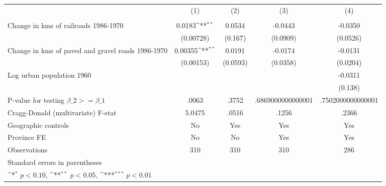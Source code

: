 {
\def\sym#1{\ifmmode^{#1}\else\(^{#1}\)\fi}
\begin{tabular}{l*{4}{c}}
\hline\hline
                &\multicolumn{1}{c}{(1)}&\multicolumn{1}{c}{(2)}&\multicolumn{1}{c}{(3)}&\multicolumn{1}{c}{(4)}\\
                &\multicolumn{1}{c}{}&\multicolumn{1}{c}{}&\multicolumn{1}{c}{}&\multicolumn{1}{c}{}\\
\hline
Change in kms of railroads 1986-1970&   0.0183\sym{**} &   0.0534         &  -0.0443         &  -0.0350         \\
                &(0.00728)         &  (0.167)         & (0.0909)         & (0.0526)         \\
[1em]
Change in kms of paved and gravel roads 1986-1970&  0.00355\sym{**} &   0.0191         &  -0.0174         &  -0.0131         \\
                &(0.00153)         & (0.0593)         & (0.0358)         & (0.0204)         \\
[1em]
Log urban population 1960&                  &                  &                  &  -0.0311         \\
                &                  &                  &                  &  (0.138)         \\
\hline
P-value for testing $\beta\_{2} >= \beta\_{1}$&    .0063         &    .3752         &.6869000000000001         &.7502000000000001         \\
Cragg-Donald (multivariate) F-stat&   5.0475         &    .0516         &    .1256         &    .2366         \\
Geographic controls&       No         &      Yes         &      Yes         &      Yes         \\
Province FE     &       No         &       No         &      Yes         &      Yes         \\
Observations    &      310         &      310         &      310         &      286         \\
\hline\hline
\multicolumn{5}{l}{\footnotesize Standard errors in parentheses}\\
\multicolumn{5}{l}{\footnotesize \sym{*} \(p<0.10\), \sym{**} \(p<0.05\), \sym{***} \(p<0.01\)}\\
\end{tabular}
}
